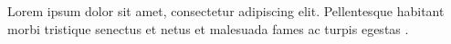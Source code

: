 
Lorem ipsum dolor sit amet, consectetur adipiscing elit. Pellentesque
habitant morbi tristique senectus et netus et malesuada fames ac
turpis egestas \cite{exemplo:artigo:2024}.
